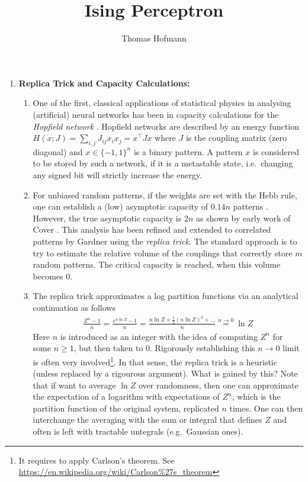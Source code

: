 \documentclass[10pt,a4pape]{article}
\author{Thomas Hofmann}
\title{Ising Perceptron}
\begin{document}
\maketitle

\begin{enumerate}
\item{\textbf{Replica Trick and Capacity Calculations:}} 
\begin{enumerate}
\item 
One of the first, classical applications of statistical physics in analysing (artificial) neural networks has been in capacity calculations for the \textit{Hopfield network} \cite{hopfield1982neural}. Hopfield networks are described by an energy function $H(x; J) = \sum_{i,j} J_{ij} x_i x_j = x^\top J x$ where $J$ is the coupling matrix (zero diagonal) and $x \in \{-1,1\}^n$ is a binary pattern. A pattern $x$ is considered to be stored by such a network, if it is a metastable state, i.e.~changing any signed bit will strictly increase the energy. 
\item 
For unbiased random patterns, if the weights are set with the Hebb rule, one can establish a (low) asymptotic capacity of $0.14n$ patterns \cite{amit1985storing}. However, the true asymptotic capacity is $2n$ as shown by early work of Cover \cite{cover1965}. This analysis has been refined and extended to correlated patterns  by Gardner \cite{gardner1987maximum} using the \textit{replica trick}. The standard approach is to try to estimate the relative volume of the couplings that correctly store $m$ random patterns. The critical capacity is reached, when this volume becomes $0$.
\item 
The replica trick approximates a log partition functions via an analytical continuation as follows %
\begin{align}
\frac{Z^n -1}{n} = \frac{e^{n \ln Z}-1}{n} = \frac{n \ln Z + \frac 12 (n \ln Z)^2 + ...}{n}  \stackrel{n \to 0}= \ln Z
\end{align}
Here $n$ is introduced as an integer with the idea of computing $Z^n$ for some $n \ge 1$, but then taken to $0$. Rigorously establishing this $n \to 0$ limit is often very involved\footnote{It requires to apply Carlson's theorem. See \url{https://en.wikipedia.org/wiki/Carlson\%27s\_theorem}}. In that sense, the replica trick is a heuristic (unless replaced by a rigourous argument). What is gained by this? Note that if want to average $\ln Z$ over randomness, then one can approximate the expectation of a logarithm with expectations of $Z^n$, which is the partition function of the original system, replicated $n$ times. One can then interchange the averaging with the sum or integral that defines $Z$ and often is left with tractable untegrals (e.g.~Gaussian ones). 

\end{enumerate}
\end{enumerate}
\end{document}

